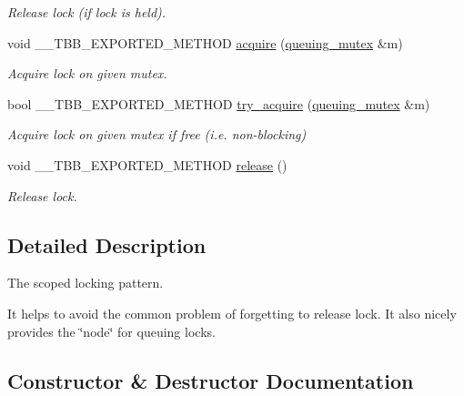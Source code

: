 \begin{DoxyCompactItemize}
\begin{DoxyCompactList}\small\item\em Release lock (if lock is held). \end{DoxyCompactList}\item 
void \+\_\+\+\_\+\+T\+B\+B\+\_\+\+E\+X\+P\+O\+R\+T\+E\+D\+\_\+\+M\+E\+T\+H\+O\+D \hyperlink{classtbb_1_1queuing__mutex_1_1scoped__lock_ac6b9289521c6b7568eedc8e0ff4e96d8}{acquire} (\hyperlink{classtbb_1_1queuing__mutex}{queuing\+\_\+mutex} \&m)
\begin{DoxyCompactList}\small\item\em Acquire lock on given mutex. \end{DoxyCompactList}\item 
bool \+\_\+\+\_\+\+T\+B\+B\+\_\+\+E\+X\+P\+O\+R\+T\+E\+D\+\_\+\+M\+E\+T\+H\+O\+D \hyperlink{classtbb_1_1queuing__mutex_1_1scoped__lock_aa35c2a7b36eb58201a804be7a36b4ccd}{try\+\_\+acquire} (\hyperlink{classtbb_1_1queuing__mutex}{queuing\+\_\+mutex} \&m)
\begin{DoxyCompactList}\small\item\em Acquire lock on given mutex if free (i.\+e. non-\/blocking) \end{DoxyCompactList}\item 
void \+\_\+\+\_\+\+T\+B\+B\+\_\+\+E\+X\+P\+O\+R\+T\+E\+D\+\_\+\+M\+E\+T\+H\+O\+D \hyperlink{classtbb_1_1queuing__mutex_1_1scoped__lock_a75112bddb38e011e9cfa69695050c771}{release} ()
\begin{DoxyCompactList}\small\item\em Release lock. \end{DoxyCompactList}\end{DoxyCompactItemize}


\subsection{Detailed Description}
The scoped locking pattern. 

It helps to avoid the common problem of forgetting to release lock. It also nicely provides the \char`\"{}node\char`\"{} for queuing locks. 

\subsection{Constructor \& Destructor Documentation}
\hypertarget{classtbb_1_1queuing__mutex_1_1scoped__lock_a0afe0107eb0aae613e726f67624d2fca}{}
